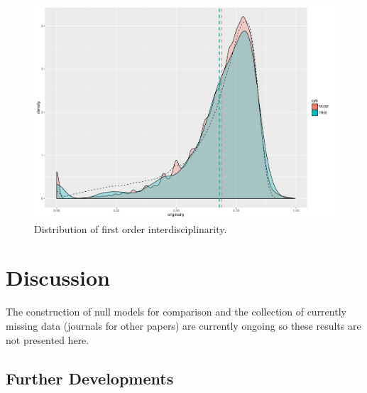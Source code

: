 \begin{figure}
\centering
\includegraphics[width=\textwidth]{figures/firstorderint_withNull}
\caption{Distribution of first order interdisciplinarity.}
\label{fig:firstorderint}
\end{figure}













\section*{Discussion}
\label{sec:discussion}



The construction of null models for comparison and the collection of currently missing data (journals for other papers) are currently ongoing so these results are not presented here.




\subsection*{Further Developments}






